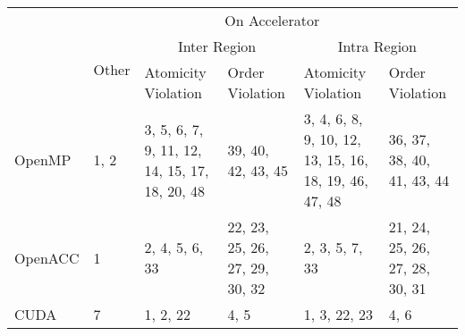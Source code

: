 \documentclass[border=10pt]{standalone}
\begin{document}
\begin{tabular}{|p{2cm}|p{1.5cm}|p{3cm}|p{2cm}|p{1.5cm}|p{3cm}|p{3cm}|p{1.5cm}|}
\hline
\multirow{3}{*}{} & \multicolumn{7}{c|}{On Accelerator}                                                                                                                                                                                                        \\ \cline{2-8} 
                  & \multirow{2}{*}{Other} & \multicolumn{3}{c|}{Inter Region}                                                                   & \multicolumn{3}{c|}{Intra Region}                                                                           \\ \cline{3-8} 
                  &                        & Atomicity Violation                           & \multicolumn{2}{l|}{Order Violation}                & Atomicity Violation                                   & \multicolumn{2}{l|}{Order Violation}                \\ \hline
OpenMP            & 1, 2                   & 3, 5, 6, 7, 9, 11, 12, 14, 15, 17, 18, 20, 48 & \multicolumn{2}{l|}{39, 40, 42, 43, 45}             & 3, 4, 6, 8, 9, 10, 12, 13, 15, 16, 18, 19, 46, 47, 48 & \multicolumn{2}{l|}{36, 37, 38, 40, 41, 43, 44}     \\ \hline
OpenACC           & 1                      & 2, 4, 5, 6, 33                                & \multicolumn{2}{l|}{22, 23, 25, 26, 27, 29, 30, 32} & 2, 3, 5, 7, 33                                        & \multicolumn{2}{l|}{21, 24, 25, 26, 27, 28, 30, 31} \\ \hline
CUDA              & 7                      & 1, 2, 22                                      & \multicolumn{2}{l|}{4, 5}                           & 1, 3, 22, 23                                          & \multicolumn{2}{l|}{4, 6}                           \\ \hline
\end{tabular}
\end{document}
